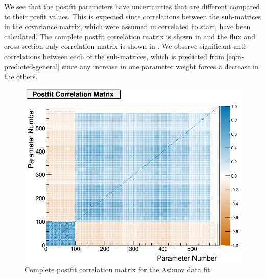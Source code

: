 We see that the postfit parameters have uncertainties that are different
compared to their prefit values. This is expected since correlations
between the sub-matrices in the covariance matrix, which were assumed
uncorrelated to start, have been calculated. The complete postfit
correlation matrix is shown in 
and the flux and cross section only correlation matrix is shown in
. We observe significant
anti-correlations between each of the sub-matrices, which is predicted
from \eqref{eq:n-predicted-general} since any increase in one parameter
weight forces a decrease in the others.

\begin{figure}
\begin{centering}
\includegraphics[height=0.4\textheight]{Chapters/Figures/Validation/Asimov/corr_post}
\par\end{centering}
\caption[Complete Postfit Correlation Matrix for the Asimov Data Fit]{Complete postfit correlation matrix for the Asimov data fit.\label{fig:Complete-postfit-correlation}}
\end{figure}

